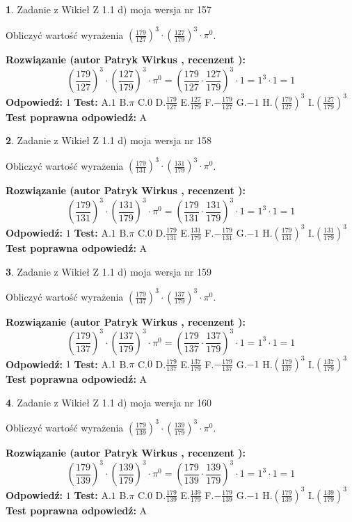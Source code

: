 \documentclass[12pt, a4paper]{article}
\theoremstyle{definition} %
\newtheorem{zad}{}
\newcommand{\zadStart}[1]{\begin{zad}#1\newline}
\newcommand{\zadStop}{\end{zad}}
\newcommand{\rozwStart}[2]{\noindent \textbf{Rozwiązanie (autor #1 , recenzent #2): }\newline}
\newcommand{\rozwStop}{\newline}
\newcommand{\odpStart}{\noindent \textbf{Odpowiedź:}\newline}
\newcommand{\odpStop}{\newline}
\newcommand{\testStart}{\noindent \textbf{Test:}\newline}
\newcommand{\testStop}{\newline}
\newcommand{\kluczStart}{\noindent \textbf{Test poprawna odpowiedź:}\newline}
\newcommand{\kluczStop}{\newline}
\begin{document}
\zadStart{Zadanie z Wikieł Z 1.1 d) moja wersja nr 157}

Obliczyć wartość wyrażenia $(\frac{179}{127})^{3} \cdot (\frac{127}{179})^{3} \cdot \pi^{0}$.
\zadStop
\rozwStart{Patryk Wirkus}{}
$$(\frac{179}{127})^{3} \cdot (\frac{127}{179})^{3} \cdot \pi^{0} = (\frac{179}{127} \cdot \frac{127}{179})^{3} \cdot 1 = 1^{3} \cdot 1 = 1$$
\rozwStop
\odpStart
$1$
\odpStop
\testStart
A.$1$ B.$\pi$ C.$0$ D.$\frac{179}{127}$ E.$\frac{127}{179}$
F.$-\frac{179}{127}$ G.$-1$
H.$(\frac{179}{127})^{3}$
I.$(\frac{127}{179})^{3}$
\testStop
\kluczStart
A
\kluczStop



\zadStart{Zadanie z Wikieł Z 1.1 d) moja wersja nr 158}

Obliczyć wartość wyrażenia $(\frac{179}{131})^{3} \cdot (\frac{131}{179})^{3} \cdot \pi^{0}$.
\zadStop
\rozwStart{Patryk Wirkus}{}
$$(\frac{179}{131})^{3} \cdot (\frac{131}{179})^{3} \cdot \pi^{0} = (\frac{179}{131} \cdot \frac{131}{179})^{3} \cdot 1 = 1^{3} \cdot 1 = 1$$
\rozwStop
\odpStart
$1$
\odpStop
\testStart
A.$1$ B.$\pi$ C.$0$ D.$\frac{179}{131}$ E.$\frac{131}{179}$
F.$-\frac{179}{131}$ G.$-1$
H.$(\frac{179}{131})^{3}$
I.$(\frac{131}{179})^{3}$
\testStop
\kluczStart
A
\kluczStop



\zadStart{Zadanie z Wikieł Z 1.1 d) moja wersja nr 159}

Obliczyć wartość wyrażenia $(\frac{179}{137})^{3} \cdot (\frac{137}{179})^{3} \cdot \pi^{0}$.
\zadStop
\rozwStart{Patryk Wirkus}{}
$$(\frac{179}{137})^{3} \cdot (\frac{137}{179})^{3} \cdot \pi^{0} = (\frac{179}{137} \cdot \frac{137}{179})^{3} \cdot 1 = 1^{3} \cdot 1 = 1$$
\rozwStop
\odpStart
$1$
\odpStop
\testStart
A.$1$ B.$\pi$ C.$0$ D.$\frac{179}{137}$ E.$\frac{137}{179}$
F.$-\frac{179}{137}$ G.$-1$
H.$(\frac{179}{137})^{3}$
I.$(\frac{137}{179})^{3}$
\testStop
\kluczStart
A
\kluczStop



\zadStart{Zadanie z Wikieł Z 1.1 d) moja wersja nr 160}

Obliczyć wartość wyrażenia $(\frac{179}{139})^{3} \cdot (\frac{139}{179})^{3} \cdot \pi^{0}$.
\zadStop
\rozwStart{Patryk Wirkus}{}
$$(\frac{179}{139})^{3} \cdot (\frac{139}{179})^{3} \cdot \pi^{0} = (\frac{179}{139} \cdot \frac{139}{179})^{3} \cdot 1 = 1^{3} \cdot 1 = 1$$
\rozwStop
\odpStart
$1$
\odpStop
\testStart
A.$1$ B.$\pi$ C.$0$ D.$\frac{179}{139}$ E.$\frac{139}{179}$
F.$-\frac{179}{139}$ G.$-1$
H.$(\frac{179}{139})^{3}$
I.$(\frac{139}{179})^{3}$
\testStop
\kluczStart
A
\kluczStop
\end{document}
